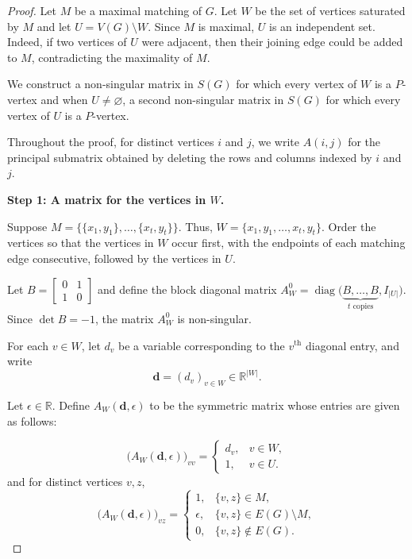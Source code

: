\documentclass[10pt,a4paper]{amsart}
\begin{document}
\begin{proof}
Let \(M\) be a maximal matching of \(G\). Let \(W\) be the set of
vertices saturated by \(M\) and let
\(
U=V(G)\setminus W.
\)
Since \(M\) is maximal, \(U\) is an independent set. Indeed, if two
vertices of \(U\) were adjacent, then their joining edge could be added
to \(M\), contradicting the maximality of \(M\).

We construct a non-singular matrix in \(S(G)\) for which every vertex
of \(W\) is a \(P\)-vertex and when \(U\neq\varnothing\), a second
non-singular matrix in \(S(G)\) for which every vertex of \(U\) is a
\(P\)-vertex.

Throughout the proof, for distinct vertices \(i\) and \(j\), we write
\(A(i,j)\) for the principal submatrix obtained by deleting the rows
and columns indexed by \(i\) and \(j\).

\medskip

\noindent
\textbf{Step 1: A matrix for the vertices in \(W\).}

Suppose
\(
M=\bigl\{\{x_1,y_1\},\ldots,\{x_t,y_t\}\bigr\}.
\)
Thus,
\(
W=\{x_1,y_1,\ldots,x_t,y_t\}.
\)
Order the vertices so that the vertices in \(W\) occur first, with the
endpoints of each matching edge consecutive, followed by the vertices
in \(U\).

Let
\(
B=
\begin{bmatrix}
0&1\\
1&0
\end{bmatrix}
\)
and define the block diagonal matrix
\(
A_W^0=
\operatorname{diag}
\bigl(
\underbrace{B,\ldots,B}_{t\text{ copies}},
I_{|U|}
\bigr).
\)
Since \(\det B=-1\), the matrix \(A_W^0\) is non-singular.

For each \(v\in W\), let \(d_v\) be a variable corresponding to the
\(v^\text{th}\) diagonal entry, and write
\[
\mathbf d=(d_v)_{v\in W}\in\mathbb R^{|W|}.
\]

Let \(\epsilon\in\mathbb R\). Define \(A_W(\mathbf d,\epsilon)\) to be
the symmetric matrix whose entries are given as follows:

\[
\bigl(A_W(\mathbf d,\epsilon)\bigr)_{vv}
=
\begin{cases}
d_v, & v\in W,\\
1,   & v\in U.
\end{cases}
\]
and for distinct vertices \(v,z\),
\[
\bigl(A_W(\mathbf d,\epsilon)\bigr)_{vz}
=
\begin{cases}
1,
& \{v,z\}\in M,\\
\epsilon,
& \{v,z\}\in E(G)\setminus M,\\
0,
& \{v,z\}\notin E(G).
\end{cases}
\]


\end{proof}
\end{document}
